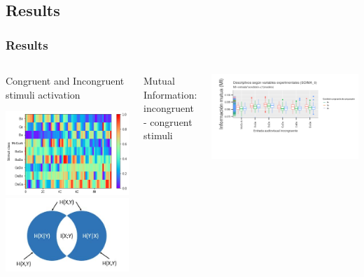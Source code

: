 \documentclass{beamer}
\begin{document}
\subsection{Results}


\begin{frame}
\frametitle{Results}
\begin{columns}
\begin{center}
\begin{tiny}
Congruent and Incongruent stimuli activation
\end{tiny}
\includegraphics[width=\textwidth]{images/testmatrixmmr}
\includegraphics[width=.4\textwidth]{images/MI}\\
\end{center}
\begin{tiny}
Mutual Information: incongruent - congruent stimuli
\end{tiny}
\includegraphics[width=\textwidth]{images/SOIMA0_MI}

\end{columns}
\end{frame}
\end{document}
